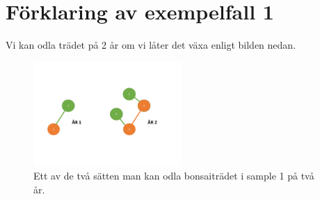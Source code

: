 \section*{Förklaring av exempelfall 1}
Vi kan odla trädet på 2 år om vi låter det växa enligt bilden nedan. 

\begin{figure}[h]
	\centering
\includegraphics[width=0.5\textwidth]{Bonsai_tree}
\caption{Ett av de två sätten man kan odla bonsaiträdet i sample 1 på två år.}
\end{figure}
